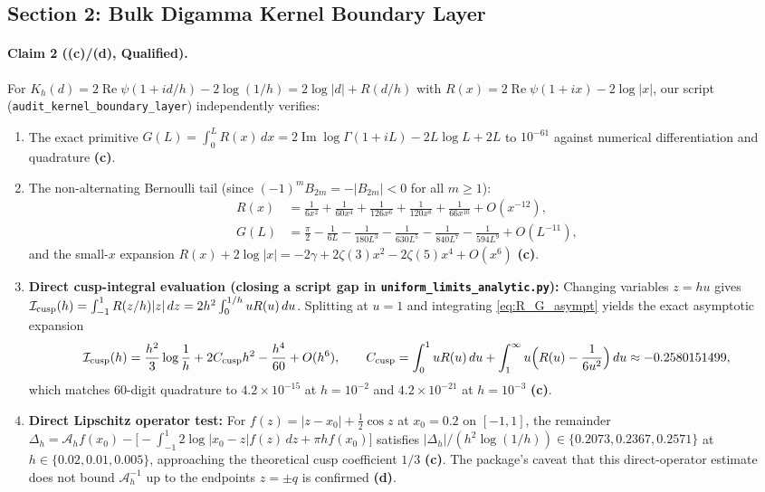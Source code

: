 \documentclass[11pt,a4paper]{article}
\newcommand{\C}{\textbf{(c)}}
\newcommand{\D}{\textbf{(d)}}
\newcommand{\scr}[1]{\texttt{#1}}
\begin{document}
\subsection{Section 2: Bulk Digamma Kernel Boundary Layer}
\paragraph{Claim 2 (\C/\D, Qualified).}
For $K_h(d)=2\operatorname{Re}\psi(1+id/h)-2\log(1/h)=2\log|d|+R(d/h)$ with
$R(x)=2\operatorname{Re}\psi(1+ix)-2\log|x|$, our script
(\texttt{audit\_kernel\_boundary\_layer}) independently verifies:
\begin{enumerate}
\item The exact primitive $G(L)=\int_0^L R(x)\,dx=2\operatorname{Im}\log\Gamma(1+iL)-2L\log L+2L$
to $10^{-61}$ against numerical differentiation and quadrature \C.
\item The non-alternating Bernoulli tail (since $(-1)^m B_{2m}=-|B_{2m}|<0$ for all $m\ge 1$):
\begin{align}
 R(x) &= \frac{1}{6x^2}+\frac{1}{60x^4}+\frac{1}{126x^6}+\frac{1}{120x^8}+\frac{1}{66x^{10}}+O(x^{-12}),\nonumber\\
 G(L) &= \frac{\pi}{2}-\frac{1}{6L}-\frac{1}{180L^3}-\frac{1}{630L^5}-\frac{1}{840L^7}-\frac{1}{594L^9}+O(L^{-11}), \label{eq:R_G_asympt}
\end{align}
and the small-$x$ expansion $R(x)+2\log|x|=-2\gamma+2\zeta(3)x^2-2\zeta(5)x^4+O(x^6)$ \C.
\item \textbf{Direct cusp-integral evaluation (closing a script gap in \scr{uniform\_limits\_analytic.py}):}
Changing variables $z=hu$ gives $\mathcal I_{\rm cusp}(h)=\int_{-1}^1 R(z/h)|z|\,dz=2h^2\int_0^{1/h}uR(u)\,du$.
Splitting at $u=1$ and integrating \eqref{eq:R_G_asympt} yields the exact
asymptotic expansion
\begin{equation}
 \mathcal I_{\rm cusp}(h) = \frac{h^2}{3}\log\frac1h + 2C_{\rm cusp}h^2 - \frac{h^4}{60} + O(h^6),
 \qquad C_{\rm cusp} = \int_0^1 uR(u)\,du + \int_1^\infty u\Bigl(R(u)-\frac{1}{6u^2}\Bigr)\,du \approx -0.2580151499, \label{eq:I_cusp}
\end{equation}
which matches 60-digit quadrature to $4.2\times 10^{-15}$ at $h=10^{-2}$ and
$4.2\times 10^{-21}$ at $h=10^{-3}$ \C.
\item \textbf{Direct Lipschitz operator test:} For $f(z)=|z-x_0|+\frac12\cos z$ at
$x_0=0.2$ on $[-1,1]$, the remainder
$\Delta_h=\mathcal A_h f(x_0)-\bigl[-\int_{-1}^1 2\log|x_0-z|f(z)\,dz+\pi h f(x_0)\bigr]$
satisfies $|\Delta_h|/(h^2\log(1/h))\in\{0.2073,0.2367,0.2571\}$ at
$h\in\{0.02,0.01,0.005\}$, approaching the theoretical cusp coefficient $1/3$ \C.
The package's caveat that this direct-operator estimate does not bound
$\mathcal A_h^{-1}$ up to the endpoints $z=\pm q$ is confirmed \D.
\end{enumerate}
\end{document}
